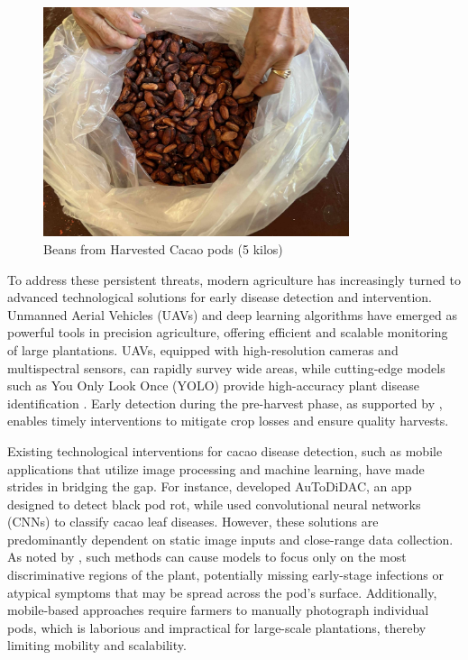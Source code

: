 {\begin{figure}[H]
	\centering
	\caption{Beans from Harvested Cacao pods (5 kilos)}
	\label{fig:beans}
	\includegraphics[width=0.8\textwidth]{figures/Beans.pdf}
\end{figure}


To address these persistent threats, modern agriculture has increasingly turned to advanced technological solutions for early disease detection and intervention. Unmanned Aerial Vehicles (UAVs) and deep learning algorithms have emerged as powerful tools in precision agriculture, offering efficient and scalable monitoring of large plantations. UAVs, equipped with high-resolution cameras and multispectral sensors, can rapidly survey wide areas, while cutting-edge models such as You Only Look Once (YOLO) provide high-accuracy plant disease identification \cite{Vyas2023}. Early detection during the pre-harvest phase, as supported by \cite{Upadhyay2025,Yadav2024}, enables timely interventions to mitigate crop losses and ensure quality harvests.

Existing technological interventions for cacao disease detection, such as mobile applications that utilize image processing and machine learning, have made strides in bridging the gap. For instance, \cite{Tan2018} developed AuToDiDAC, an app designed to detect black pod rot, while \cite{Tovurawa2025} used convolutional neural networks (CNNs) to classify cacao leaf diseases. However, these solutions are predominantly dependent on static image inputs and close-range data collection. As noted by \cite{Taesiri2023}, such methods can cause models to focus only on the most discriminative regions of the plant, potentially missing early-stage infections or atypical symptoms that may be spread across the pod’s surface. Additionally, mobile-based approaches require farmers to manually photograph individual pods, which is laborious and impractical for large-scale plantations, thereby limiting mobility and scalability.

}
